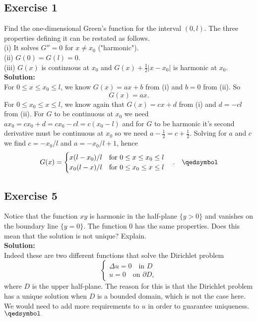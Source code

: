\documentclass[12pt]{article}%
\begin{document}
\subsection*{Exercise 1}
Find the one-dimensional Green's function for the interval $(0,l)$. The three
properties defining it can be restated as follows.\\
(i) It solves $G''=0$ for $x\neq x_0$ ("harmonic").\\
(ii) $G(0)=G(l)=0$.\\
(iii) $G(x)$ is continuous at $x_0$ and $G(x)+\frac{1}{2}|x-x_0|$ is harmonic at $x_0$.\\
\textbf{Solution:}\\
For $0\leq x \leq x_0\leq l$, we know $G(x)=ax+b$ from (i) and $b=0$ from (ii). So
\[
G(x)=ax.
\]
For $0\leq x_0\leq x\leq l$, we know again that $G(x)=cx+d$ from
(i) and $d=-cl$ from (ii). For $G$ to be continuous at $x_0$ we
need $ax_0=cx_0+d=cx_0-cl=c(x_0-l)$ and for $G$ to be harmonic it's second
derivative must be continuous at $x_0$ so we need $a-\frac{1}{2}=c+\frac{1}{2}$. Solving for $a$ and $c$ we find $c=-x_0/l$ and $a=-x_0/l+1$, hence
\[
    G(x) =\begin{cases}
        x(l-x_0)/l \quad \text{for } 0\leq x\leq x_0 \leq l\\
        x_0(l-x)/l \quad \text{for } 0\leq x_0\leq x \leq l
    \end{cases}. \quad \qedsymbol
\]
\subsection*{Exercise 5}
Notice that the function $xy$ is harmonic in the half-plane
$\{y>0\}$ and vanishes on the boundary line $\{y=0\}$. The function 0 has the same properties. Does this mean that the solution is not unique? Explain.\\
\textbf{Solution:}\\
Indeed these are two different functions that solve the Dirichlet
problem
\[
    \begin{cases}
    \Delta u =0 \quad \text{in } D\\
    u =0 \quad \text{on } \partial D,
    \end{cases}
\]
where $D$ is the upper half-plane. The reason for this is that the
Dirichlet problem has a unique solution when $D$ is a bounded domain,
which is not the case here. We would need to add more requirements to $u$
in order to guarantee uniqueness. $\qedsymbol$
\end{document}
